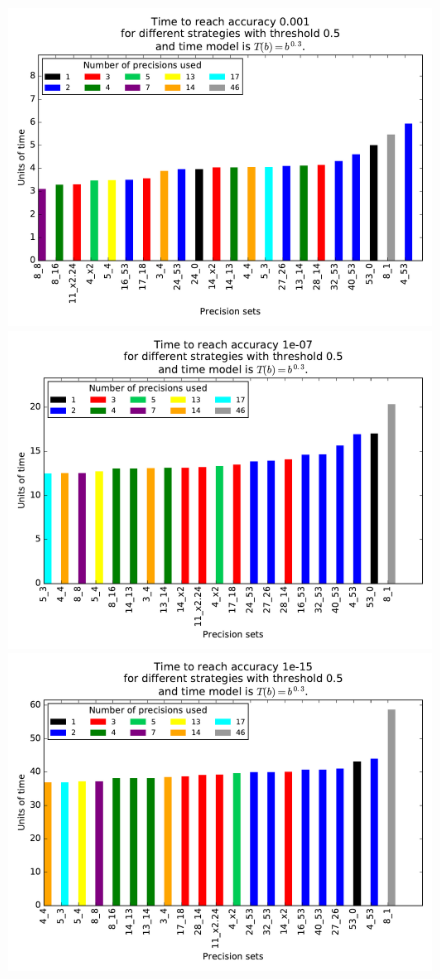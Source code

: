    \begin{figure}
    \includegraphics[width=0.33\linewidth]{figs/cost_3.pdf}
    \includegraphics[width=0.33\linewidth]{figs/cost_7.pdf}
    \includegraphics[width=0.33\linewidth]{figs/cost_15.pdf}
    \caption{}
    \label{fig.estimation1}
   \end{figure}
   
